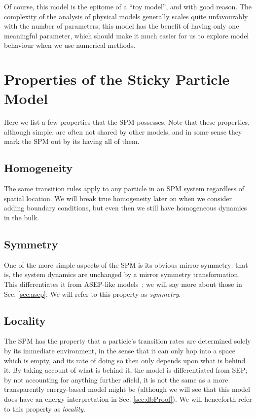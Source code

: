Of course, this model is the epitome of a ``toy model'', and with good reason. The complexity of the
analysis of physical models generally scales quite unfavourably with the number of parameters; this model
has the benefit of having only one meaningful parameter, which should make it much easier for us
to explore model behaviour when we use numerical methods.

\section{Properties of the Sticky Particle Model} \label{sec:spmProperties}
Here we list a few properties that the SPM possesses. Note that these properties, although simple, are
often not shared by other models, and in some sense they mark the SPM out by its having all of them.
\subsection{Homogeneity}
The same transition rules apply to any particle in an SPM system regardless of spatial location.
We will break true homogeneity later on when we consider adding boundary conditions, but even then
we still have homogeneous dynamics in the bulk.
\subsection{Symmetry}
One of the more simple aspects of the SPM is its obvious mirror symmetry: that is, the system dynamics
are unchanged by a mirror symmetry transformation. This differentiates it from ASEP-like models~\cite{golinelli2006}; we
will say more about those in Sec. \ref{sec:asep}. We will refer to this property as \textit{symmetry}.
\subsection{Locality}
The SPM has the property that a particle's transition rates are determined solely by its immediate
environment, in the sense that it can only hop into a space which is empty, and its rate of doing so
then only depends upon what is behind it. By taking account of what is behind it, the model is differentiated from SEP; by not accounting 
for anything further afield, it is not the
same as a more transparently energy-based model might be (although we will see that this model does
have an energy interpretation in Sec. \ref{sec:dbProof}). We will henceforth refer to this property
as \textit{locality}.
